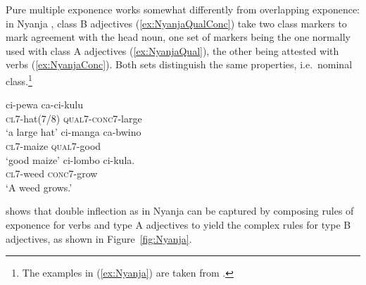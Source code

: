 \documentclass[output=paper
 	        ,biblatex
                ,babelshorthands
                ,newtxmath
                ,draftmode
                ,colorlinks, citecolor=brown
]{langscibook}
\begin{document}
\begin{exe}
\begin{xlist}
\begin{exe}
\begin{xlist}
Pure multiple exponence works somewhat differently from
overlapping exponence: in Nyanja \citep{Stump01,Crysmann:14:OUP},
class B adjectives (\ref{ex:NyanjaQualConc}) take two class markers to
mark agreement with the head noun, one set of markers being the one
normally used with class A adjectives (\ref{ex:NyanjaQual}), the other being attested with
verbs (\ref{ex:NyanjaConc}). Both sets distinguish the same
properties, i.e.\ nominal class.\label{Nyanja}\footnote{The examples in (\ref{ex:Nyanja}) are taken from .}

\eal
\label{ex:Nyanja}
\ex\label{ex:NyanjaQualConc}
\gll ci-pewa ca-ci-kulu\\
    \textsc{cl7}-hat(7/8) \textsc{qual7}-\textsc{conc7}-large\\
\glt `a large hat'
\ex
\label{ex:NyanjaQual} 
\gll ci-manga ca-bwino\\
    \textsc{cl7}-maize \textsc{qual7}-good\\
\glt `good maize'
\ex
\label{ex:NyanjaConc} 
\gll ci-lombo ci-kula.\\
    \textsc{cl7}-weed \textsc{conc7}-grow\\
\glt `A weed grows.'
\zl

\citet{Crysmann:14:OUP} shows that double inflection as in Nyanja
can be captured by composing rules of exponence for verbs and type A
adjectives to yield the complex rules for type B adjectives, as shown
in Figure~\ref{fig:Nyanja}. 


\end{xlist}
\end{exe}
\end{xlist}
\end{exe}
\end{document}
